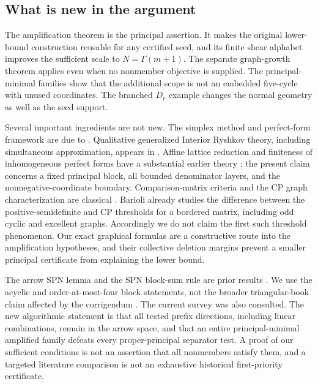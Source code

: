\subsection{What is new in the argument}
The amplification theorem is the principal assertion. It makes the original lower-bound construction reusable for any certified seed, and its finite shear alphabet improves the sufficient scale to $N=\Gamma(m+1)$. The separate graph-growth theorem applies even when no nonmember objective is supplied. The principal-minimal families show that the additional scope is not an embedded five-cycle with unused coordinates. The branched $D_r$ example changes the normal geometry as well as the seed support.

Several important ingredients are not new. The simplex method and perfect-form framework are due to \cite{DSV,DS}. Qualitative generalized Interior Ryshkov theory, including simultaneous approximation, appears in \cite{OS}. Affine lattice reduction and finiteness of inhomogeneous perfect forms have a substantial earlier theory \cite{Inhom}; the present claim concerns a fixed principal block, all bounded denominator layers, and the nonnegative-coordinate boundary. Comparison-matrix criteria and the CP graph characterization are classical \cite{Drew,Kogan}. Barioli \cite{Barioli} already studies the difference between the positive-semidefinite and CP thresholds for a bordered matrix, including odd cyclic and excellent graphs. Accordingly we do not claim the first such threshold phenomenon. Our exact graphical formulas are a constructive route into the amplification hypotheses, and their collective deletion margins prevent a smaller principal certificate from explaining the lower bound.

The arrow SPN lemma and the SPN block-sum rule are prior results \cite{SPN}. We use the acyclic and order-at-most-four block statements, not the broader triangular-book claim affected by the corrigendum \cite{SPNcorr}. The current survey \cite{SPNsurvey} was also consulted. The new algorithmic statement is that all tested prefix directions, including linear combinations, remain in the arrow space, and that an entire principal-minimal amplified family defeats every proper-principal separator test. A proof of our sufficient conditions is not an assertion that all nonmembers satisfy them, and a targeted literature comparison is not an exhaustive historical first-priority certificate.

